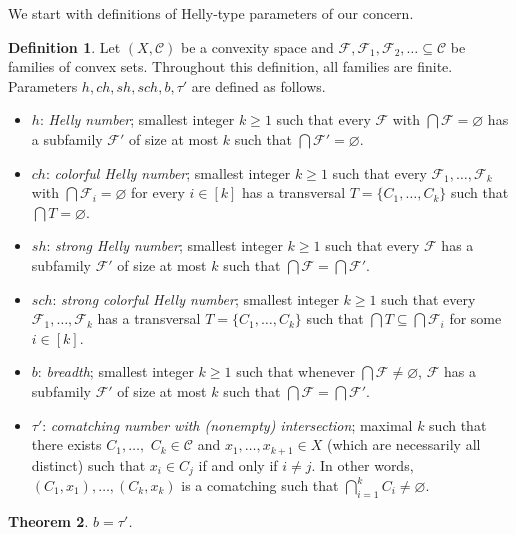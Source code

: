 \documentclass[11pt]{article}
\newtheorem{thm}{Theorem}[section]%
\theoremstyle{definition}
\newtheorem{definition}[thm]{Definition}
\newcommand{\F}{\mathcal{F}}
\newcommand{\C}{\mathcal{C}}
\begin{document}
We start with definitions of Helly-type parameters of our concern.
\begin{definition}
    Let $(X, \C)$ be a convexity space and $\F, \F_1, \F_2, \ldots \subseteq \C$ be families of convex sets.
    Throughout this definition, all families are finite.
    Parameters $h, ch, sh, sch, b, \tau'$ are defined as follows.
    \begin{itemize}
        \item $h$: \emph{Helly number}; smallest integer $k \geq 1$ such that every $\F$ with $\bigcap \F = \varnothing$ has a subfamily $\F'$ of size at most $k$ such that $\bigcap \F' = \varnothing$.
        \item $ch$: \emph{colorful Helly number}; smallest integer $k \geq 1$ such that every $\F_1, \ldots, \F_k$ with $\bigcap \F_i = \varnothing$ for every $i \in [k]$ has a transversal $T = \{C_1, \ldots, C_k\}$ such that $\bigcap T = \varnothing$.
        \item $sh$: \emph{strong Helly number}; smallest integer $k \geq 1$ such that every $\F$ has a subfamily $\F'$ of size at most $k$ such that $\bigcap \F = \bigcap \F'$.
        \item $sch$: \emph{strong colorful Helly number}; smallest integer $k \geq 1$ such that every $\F_1, \ldots, \F_k$ has a transversal $T = \{C_1, \ldots, C_k\}$ such that $\bigcap T \subseteq \bigcap \F_i$ for some $i \in [k]$.
        \item $b$: \emph{breadth}; smallest integer $k \geq 1$ such that whenever $\bigcap \F \neq \varnothing$, $\F$ has a subfamily $\F'$ of size at most $k$ such that $\bigcap \F = \bigcap \F'$.
        \item $\tau'$: \emph{comatching number with (nonempty) intersection}; maximal $k$ such that there exists $C_1, \ldots,$ $C_k \in \C$ and $x_1, \ldots, x_{k+1} \in X$ (which are necessarily all distinct) such that $x_i \in C_j$ if and only if $i \neq j$.
        In other words, $(C_1, x_1), \ldots, (C_k, x_k)$ is a comatching such that $\bigcap_{i = 1}^k C_i \neq \varnothing$.
    \end{itemize}
\end{definition}
\begin{thm}
    $b = \tau'$.
\end{thm}
\end{document}
